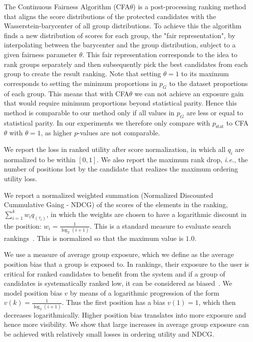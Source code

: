  The Continuous Fairness Algorithm (CFA$\theta$) is a post-processing ranking method that aligns the score distributions of the protected candidates with the Wasserstein-barycenter of all group distributions.
%
To achieve this the algorithm finds a new distribution of scores for each group, the "fair representation", by interpolating between the barycenter and the group distribution, subject to a given fairness parameter $\theta$.
%
This fair representation corresponds to the idea to rank groups separately and then subsequently pick the best candidates from each group to create the result ranking.
%
Note that setting $\theta=1$ to its maximum corresponds to setting the minimum proportions in $p_G$ to the dataset proportions of each group.
%
This means that with CFA$\theta$ we can not achieve an exposure gain that would require minimum proportions beyond statistical parity.
%
Hence this method is comparable to our method only if all values in $p_G$ are less or equal to statistical parity.
%
In our experiments we therefore only compare \algoFAIR with $p_{\text{stat}}$ to CFA$\theta$ with $\theta=1$, as higher $p$-values are not comparable.


 We report the loss in ranked utility after score normalization, in which all $q_i$ are normalized to be within $[0, 1]$.
%
We also report the maximum rank drop, {\em i.e.}, the number of positions lost by the candidate that realizes the maximum ordering utility loss.


%
We report a normalized weighted summation (Normalized Discounted Cummulative Gaing - NDCG) of the scores of the elements in the ranking, $\sum_{i=1}^{k} w_i q_{(\tau_i)}$, in which the weights are chosen to have a logarithmic discount in the position:  $w_i = \frac{1}{\log_2 (i+1)}$. This is a standard measure to evaluate search rankings~\cite{jarvelin2002cumulated}.
This is normalized so that the maximum value is $1.0$.


 We use a measure of average group exposure, which we define as the average position bias that a group is exposed to.
%
In rankings, their exposure to the user is critical for ranked candidates to benefit from the system and if a group of candidates is systematically ranked low, it can be considered as biased~\cite{friedman1996bias}.
%
We model position bias $v$ by means of a logarithmic progression of the form $v(k) = \frac{1}{\log_2(i+1)}$.
%
Thus the first position has a bias $v(1)=1$, which then decreases logarithmically.
%
Higher position bias translates into more exposure and hence more visibility.
%
We show that large increases in average group exposure can be achieved with relatively small losses in ordering utility and NDCG.


